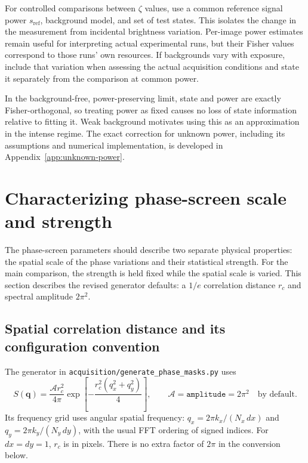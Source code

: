 \documentclass[11pt,a4paper]{article}
\begin{document}
For controlled comparisons between $\zeta$ values, use a common reference
signal power $s_{\mathrm{ref}}$, background model, and set of test states.
This isolates the change in the measurement from incidental brightness
variation. Per-image power estimates remain useful for interpreting actual
experimental runs, but their Fisher values correspond to those runs' own
resources. If backgrounds vary with exposure, include that variation when
assessing the actual acquisition conditions and state it separately from
the comparison at common power.

In the background-free, power-preserving limit, state and power are exactly
Fisher-orthogonal, so treating power as fixed causes no loss of state
information relative to fitting it. Weak background motivates using this
as an approximation in the intense regime. The exact correction for unknown
power, including its assumptions and numerical implementation, is developed
in Appendix~\ref{app:unknown-power}.

\section{Characterizing phase-screen scale and strength}\label{sec:screen-parameters}
The phase-screen parameters should describe two separate physical properties:
the spatial scale of the phase variations and their statistical strength.
For the main comparison, the strength is held fixed while the spatial
scale is varied. This section describes the revised generator defaults:
a $1/e$ correlation distance $r_c$ and spectral amplitude $2\pi^2$.

\subsection{Spatial correlation distance and its configuration convention}
The generator in \texttt{acquisition/generate\_phase\_masks.py} uses
\begin{equation}
 S(\mathbf q)=\frac{\mathcal A r_c^2}{4\pi}
 \exp\!\left[-\frac{r_c^2(q_x^2+q_y^2)}4\right],
 \qquad \mathcal A=\texttt{amplitude}=2\pi^2\quad\text{by default}.
 \label{eq:screen-spectrum}
\end{equation}
Its frequency grid uses angular spatial frequency:
$q_x=2\pi k_x/(N_x\,dx)$ and $q_y=2\pi k_y/(N_y\,dy)$, with the usual
FFT ordering of signed indices. For $dx=dy=1$, $r_c$ is in pixels.
There is no extra factor of $2\pi$ in the conversion below.
\end{document}
